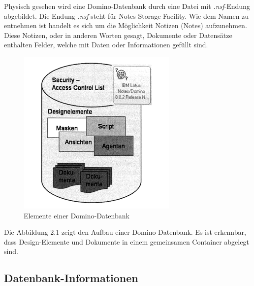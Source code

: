 Physisch gesehen wird eine Domino-Datenbank durch eine Datei mit \textit{.nsf}-Endung abgebildet. Die Endung
\textit{.nsf} steht für Notes Storage Facility. Wie dem Namen zu entnehmen ist handelt es sich um die Möglichkeit Notizen (Notes) aufzunehmen.
 Diese Notizen, oder in anderen Worten gesagt, Dokumente oder Datensätze enthalten Felder, welche mit Daten oder Informationen gefüllt sind\cite{ebel}.

\begin{figure}[H]
  \centerline{\includegraphics[scale=0.7]{pics/DB_container}}
  \caption[Elemente einer Domino-Datenbank]{\label{FiG:Elemente einer Domino-Datenbank }
  Elemente einer Domino-Datenbank\cite{ebel}}
\end{figure}
Die Abbildung 2.1 zeigt den Aufbau einer Domino-Datenbank. Es ist erkennbar, dass Design-Elemente und Dokumente in einem gemeinsamen Container
abgelegt sind. 


\vspace{1cm}


\subsection{Datenbank-Informationen}
\label{sec:3dominoDB}

